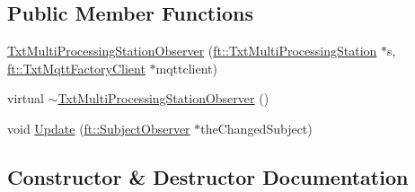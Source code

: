 \subsection*{Public Member Functions}
\begin{DoxyCompactItemize}
\item 
\hyperlink{classft_1_1_txt_multi_processing_station_observer_ab8bb2c64860c60ab17970c4f5ef9ca93}{Txt\+Multi\+Processing\+Station\+Observer} (\hyperlink{classft_1_1_txt_multi_processing_station}{ft\+::\+Txt\+Multi\+Processing\+Station} $\ast$s, \hyperlink{classft_1_1_txt_mqtt_factory_client}{ft\+::\+Txt\+Mqtt\+Factory\+Client} $\ast$mqttclient)
\item 
virtual \hyperlink{classft_1_1_txt_multi_processing_station_observer_a0b1f277448c1411848f6315967d93ae2}{$\sim$\+Txt\+Multi\+Processing\+Station\+Observer} ()
\item 
void \hyperlink{classft_1_1_txt_multi_processing_station_observer_aeddc4246174e6fd5aaa75823416c5e85}{Update} (\hyperlink{classft_1_1_subject_observer}{ft\+::\+Subject\+Observer} $\ast$the\+Changed\+Subject)
\end{DoxyCompactItemize}


\subsection{Constructor \& Destructor Documentation}
